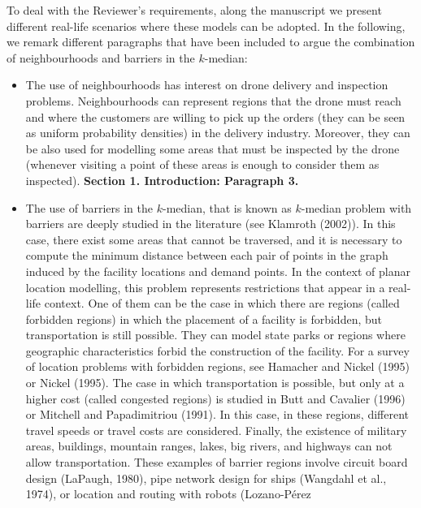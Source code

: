 \documentclass{article}
\newenvironment{reviewer}{\setcounter{pointcounter}{1}}{}
\newcommand{\point}{\text{{\selectfont \thepointcounter} \stepcounter{pointcounter}}}
\begin{document}
\begin{reviewer}
		\begin{tcolorbox}[breakable,enhanced,coltitle=black,colback=red!5!white,colframe=red!75!black,title=\textbf{Answer R1.\point},borderline={1pt}{0pt}{black},boxrule=0pt]
			To deal with the Reviewer's requirements, along the manuscript we present different real-life scenarios where these models can be adopted. In the following, we remark different paragraphs that have been included to argue the combination of neighbourhoods and barriers in the $k$-median:
			\begin{itemize}
				\item The use of neighbourhoods has interest on drone delivery and inspection problems. Neighbourhoods can represent regions that the drone must reach and where the customers are willing to pick up the orders (they can be seen as uniform probability densities) in the delivery industry. Moreover, they can be also used for modelling some areas that must be inspected by the drone (whenever visiting a point of these areas is enough to consider them as inspected). \textbf{Section 1. Introduction: Paragraph 3.}
				\item The use of barriers in the $k$-median, that is known as $k$-median problem with barriers are deeply studied in the literature (see Klamroth (2002)). In this case, there exist some areas that cannot be traversed, and it is necessary to compute the minimum distance between each pair of points in the graph induced by the facility locations and demand points. In the context of planar location modelling, this problem represents restrictions that appear in a real-life context. One of them can be	the case in which there are regions (called forbidden regions) in which the placement of a facility is	forbidden, but transportation is still possible. They can model state parks or regions where geographic characteristics forbid the construction of the facility. For a survey of location problems with forbidden regions, see Hamacher and Nickel (1995) or Nickel (1995). The case in which transportation is possible,
				but only at a higher cost (called congested regions) is studied in Butt and Cavalier (1996) or Mitchell and	Papadimitriou (1991). In this case, in these regions, different travel speeds or travel costs are considered. Finally, the existence of military areas, buildings, mountain ranges, lakes, big rivers, and highways can not allow transportation. These examples of barrier regions involve circuit board design (LaPaugh, 1980), pipe network design for ships (Wangdahl et al., 1974), or location and routing with robots (Lozano-Pérez

\end{itemize}
\end{tcolorbox}
\end{reviewer}
\end{document}
